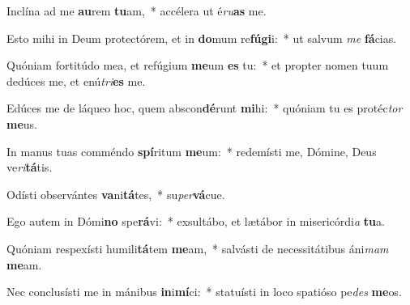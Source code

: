 \item Inclína ad me \textbf{au}rem \textbf{tu}am,~* accélera ut é\textit{ru}\textbf{as} me.
\item Esto mihi in Deum protectórem, et in \textbf{do}mum re\textbf{fú}\textbf{gi}i:~* ut salvum \textit{me} \textbf{fá}cias.
\item Quóniam fortitúdo mea, et refúgium \textbf{me}um \textbf{es} tu:~* et propter nomen tuum dedúces me, et enú\textit{tri}\textbf{es} me.
\item Edúces me de láqueo hoc, quem abscon\textbf{dé}runt \textbf{mi}hi:~* quóniam tu es protéc\textit{tor} \textbf{me}us.
\item In manus tuas comméndo \textbf{spí}ritum \textbf{me}um:~* redemísti me, Dómine, Deus ve\textit{ri}\textbf{tá}tis.
\item Odísti observántes \textbf{va}ni\textbf{tá}tes,~* su\textit{per}\textbf{vá}cue.
\item Ego autem in Dómi\textbf{no} spe\textbf{rá}vi:~* exsultábo, et lætábor in misericórdi\textit{a} \textbf{tu}a.
\item Quóniam respexísti humili\textbf{tá}tem \textbf{me}am,~* salvásti de necessitátibus áni\textit{mam} \textbf{me}am.
\item Nec conclusísti me in mánibus \textbf{in}i\textbf{mí}ci:~* statuísti in loco spatióso pe\textit{des} \textbf{me}os.
